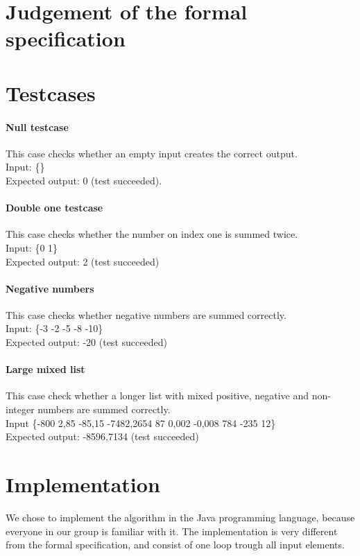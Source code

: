 \documentclass[12pt]{article}
\begin{document}
\section{Judgement of the formal specification}

\section{Testcases}

\paragraph{Null testcase}
This case checks whether an empty input creates the correct output. \\
Input: \{\} \\
Expected output: 0 (test succeeded).

\paragraph{Double one testcase}
This case checks whether the number on index one is summed twice. \\
Input: \{0 1\} \\
Expected output: 2 (test succeeded)

\paragraph{Negative numbers}
This case checks whether negative numbers are summed correctly. \\
Input: \{-3 -2 -5 -8 -10\} \\
Expected output: -20 (test succeeded)

\paragraph{Large mixed list}
This case check whether a longer list with mixed positive, negative and non-integer numbers are summed correctly. \\
Input \{-800 2,85 -85,15 -7482,2654 87 0,002 -0,008 784 -235 12\} \\
Expected output: -8596,7134 (test succeeded)

\section{Implementation}
We chose to implement the algorithm in the Java programming language, because everyone in our group is familiar with it. The implementation is very different from the formal specification, and consist of one loop trough all input elements.
\end{document}
